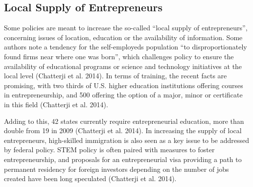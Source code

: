 \subsection{Local Supply of Entrepreneurs}

Some policies are meant to increase the so-called  ``local supply of entrepreneurs'', concerning issues of location, education or the availability of information. Some authors note a tendency for the self-employeds population ``to disproportionately found firms near where one was born'', which challenges policy to ensure the availability of educational programs or science and technology initiatives at the local level (Chatterji et al. 2014). In terms of training, the recent facts are promising, with two thirds of U.S. higher education institutions offering courses in entrepreneurship, and 500 offering the option of a major, minor or certificate in this field (Chatterji et al. 2014). 

Adding to this, 42 states currently require entrepreneurial education, more than double from 19 in 2009 (Chatterji et al. 2014). In increasing the supply of local entrepreneurs, high-skilled immigration is also seen as a key issue to be addressed by federal policy. STEM policy is often paired with measures to foster entrepreneurship, and proposals for an entrepreneurial visa providing a path to permanent residency for foreign investors depending on the number of jobs created have been long speculated (Chatterji et al. 2014).
